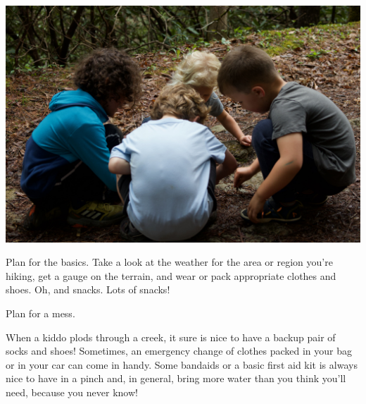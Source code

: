 \documentclass[
  letterpaper,
  DIV=11,
  numbers=noendperiod]{scrartcl}
\begin{document}
\includegraphics{img/kidslooking.jpg}

Plan for the basics. Take a look at the weather for the area or region
you're hiking, get a gauge on the terrain, and wear or pack appropriate
clothes and shoes. Oh, and snacks. Lots of snacks!

Plan for a mess.

When a kiddo plods through a creek, it sure is nice to have a backup
pair of socks and shoes! Sometimes, an emergency change of clothes
packed in your bag or in your car can come in handy. Some bandaids or a
basic first aid kit is always nice to have in a pinch and, in general,
bring more water than you think you'll need, because you never know!
\end{document}
